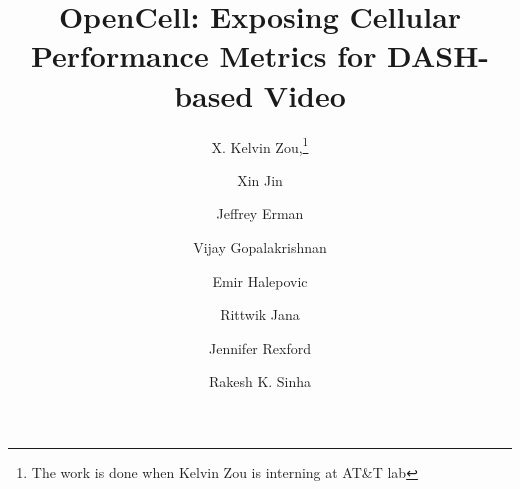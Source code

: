 \documentclass{sig-alternate-10pt}
\begin{document}
\title{OpenCell: Exposing Cellular Performance Metrics for DASH-based Video}
\author[1]{\large X. Kelvin Zou,\thanks{The work is done when Kelvin Zou is interning at AT\&T lab} }
\author[1]{\large Xin Jin}
\author[2]{\large Jeffrey Erman}
\author[2]{\large Vijay Gopalakrishnan}
\author[2]{\large Emir Halepovic}
\author[2]{\large Rittwik Jana}
\author[1]{\large Jennifer Rexford}
\author[2]{\large Rakesh K. Sinha}
 
 


\maketitle








 
 

{\small
} 
\end{document}
